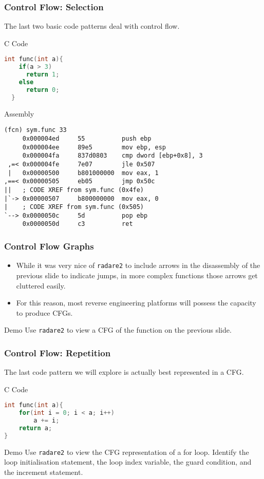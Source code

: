 \documentclass{beamer}
\begin{document}
\begin{frame}[fragile]
  \frametitle{Control Flow: Selection}
  The last two basic code patterns deal with control flow.
  \begin{block}{C Code}
  \begin{lstlisting}[basicstyle=\small\ttfamily,language=C]
  int func(int a){
    if(a > 3)
      return 1;
    else
      return 0;
  }
  \end{lstlisting}
\end{block}
\end{frame}

\begin{frame}[fragile]
\begin{block}{Assembly}
\begin{lstlisting}[basicstyle=\small\ttfamily]
(fcn) sym.func 33
     0x000004ed     55          push ebp
     0x000004ee     89e5        mov ebp, esp
     0x000004fa     837d0803    cmp dword [ebp+0x8], 3
 ,=< 0x000004fe     7e07        jle 0x507
 |   0x00000500     b801000000  mov eax, 1
,==< 0x00000505     eb05        jmp 0x50c
||   ; CODE XREF from sym.func (0x4fe)
|`-> 0x00000507     b800000000  mov eax, 0
|    ; CODE XREF from sym.func (0x505)
`--> 0x0000050c     5d          pop ebp
     0x0000050d     c3          ret
\end{lstlisting}
\end{block}
\end{frame}

\begin{frame}
  \frametitle{Control Flow Graphs}
  \begin{itemize}
    \item While it was very nice of \texttt{radare2} to include arrows in the
  disassembly of the previous slide to indicate jumps,
  in more complex functions those arrows get cluttered easily.
  \item For this reason, most reverse engineering platforms will possess the capacity to produce CFGs.
  \end{itemize}
  \begin{exampleblock}{Demo}
    Use \texttt{radare2} to view a CFG of the function on the previous slide.
  \end{exampleblock}
\end{frame}

\begin{frame}[fragile]
    \frametitle{Control Flow: Repetition}
    The last code pattern we will explore is actually best represented in a CFG.
    \begin{block}{C Code}
      \begin{lstlisting}[language=C]
int func(int a){
    for(int i = 0; i < a; i++)
        a += i;
    return a;
}
    \end{lstlisting}
    \end{block}
    \begin{exampleblock}{Demo}
    Use \texttt{radare2} to view the CFG representation of a for loop.
    Identify the loop initialisation statement, the loop index variable, the guard condition, and the increment statement.
    \end{exampleblock}
\end{frame}
\end{document}
